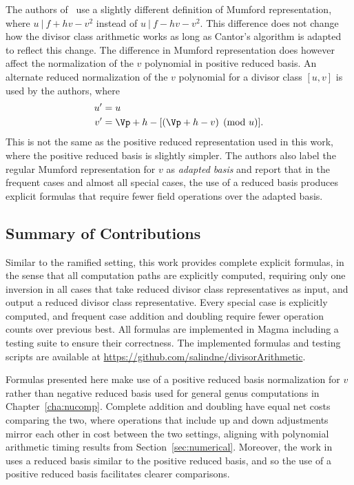 The authors of~\cite{EricksonJacobsonStein_realg2_2011} use a slightly different
definition of Mumford representation, where $u ~|~ f + hv - v^2$ instead of $u
~|~ f - hv - v^2$. This difference does not change how the divisor class
arithmetic works as long as Cantor's algorithm is adapted to reflect this
change. The difference in Mumford representation does however affect the
normalization of the $v$ polynomial in positive reduced basis. An alternate reduced
normalization of the $v$ polynomial for a divisor class $[u,v]$ is used by the
authors, where 
\begin{align}
  u' & =  u \nonumber\\
  v' & =  \Vp + h - [(\Vp + h - v) \pmod{u}]. \label{eqn:reducedbasis}
\end{align}
This is not the same as the positive reduced representation used in this work,
where the positive reduced basis is slightly simpler. The authors also label the
regular Mumford representation for $v$ as \emph{adapted basis} and report that
in the frequent cases and almost all special cases, the use of a reduced basis
produces explicit formulas that require fewer field operations over the adapted
basis.

 
\subsection{Summary of Contributions}
Similar to the ramified setting, this work provides complete explicit formulas,
in the sense that all computation paths are explicitly computed, requiring only
one inversion in all cases that take reduced divisor class representatives as
input, and output a reduced divisor class representative. Every special case is
explicitly computed, and frequent case addition and doubling require fewer
operation counts over previous best. 
All formulas are implemented in Magma
including a testing suite to ensure their correctness. The implemented formulas
and testing scripts are available at
\url{https://github.com/salindne/divisorArithmetic}.
 

Formulas presented here make use of a positive reduced basis normalization for
$v$ rather than negative reduced basis used for general genus computations in
Chapter~\ref{cha:nucomp}. Complete addition and doubling have equal net
costs comparing the two, where operations that include up and down adjustments
mirror each other in cost between the two settings, aligning with polynomial
arithmetic timing results from Section~\ref{sec:numerical}. Moreover, the work
in~\cite{EricksonJacobsonStein_realg2_2011} uses a reduced basis similar to the
positive reduced basis, and so the use of a positive reduced basis facilitates
clearer comparisons. 

